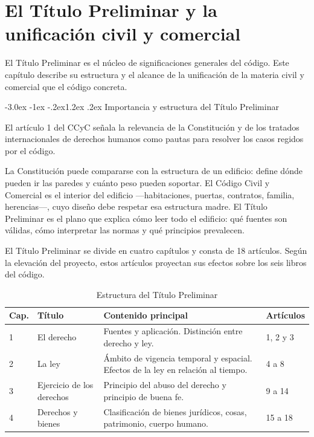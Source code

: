\documentclass[12pt,oneside]{book}
\makeatletter
\renewcommand\section{\@startsection{section}{1}{\z@}%
  {-3.0ex \@plus -1ex \@minus -.2ex}{1.2ex \@plus .2ex}%
  {\normalfont\large\bfseries\color{acento}}}
\makeatother
\begin{document}

\chapter{El Título Preliminar y la unificación civil y comercial}
\label{cap:titulo-prel}

El Título Preliminar es el núcleo de significaciones generales del código. Este capítulo describe su estructura y el alcance de la unificación de la materia civil y comercial que el código concreta.

\section{Importancia y estructura del Título Preliminar}

El artículo 1 del CCyC señala la relevancia de la Constitución y de los tratados internacionales de derechos humanos como pautas para resolver los casos regidos por el código.

\begin{nota}
La Constitución puede compararse con la estructura de un edificio: define dónde pueden ir las paredes y cuánto peso pueden soportar. El Código Civil y Comercial es el interior del edificio ---habitaciones, puertas, contratos, familia, herencias---, cuyo diseño debe respetar esa estructura madre. El Título Preliminar es el plano que explica cómo leer todo el edificio: qué fuentes son válidas, cómo interpretar las normas y qué principios prevalecen.
\end{nota}

El Título Preliminar se divide en cuatro capítulos y consta de 18 artículos. Según la elevación del proyecto, estos artículos proyectan sus efectos sobre los seis libros del código.

\begin{table}[H]
\centering
\begin{tabularx}{\textwidth}{B{0.08\textwidth} B{0.22\textwidth} Y B{0.16\textwidth}}
\toprule
\textbf{Cap.} & \textbf{Título} & \textbf{Contenido principal} & \textbf{Artículos} \\
 & El derecho & Fuentes y aplicación. Distinción entre derecho y ley. & 1, 2 y 3 \\
2 & La ley & Ámbito de vigencia temporal y espacial. Efectos de la ley en relación al tiempo. & 4 a 8 \\
3 & Ejercicio de los derechos & Principio del abuso del derecho y principio de buena fe. & 9 a 14 \\
4 & Derechos y bienes & Clasificación de bienes jurídicos, cosas, patrimonio, cuerpo humano. & 15 a 18 \\
\bottomrule
\end{tabularx}
\caption{Estructura del Título Preliminar}
\end{table}
\end{document}
